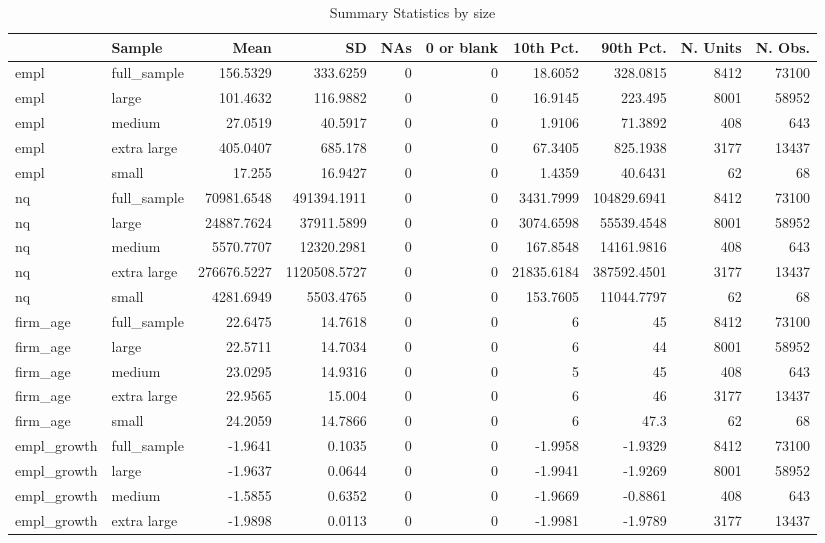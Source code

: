 \begin{table}[h]
  \caption{Summary Statistics by size }
  \centering
\begin{tabular}{l lr r r r r r r r}
\hline
 & Sample &Mean &SD &NAs &0 or blank &10th Pct. &90th Pct. &N. Units &N. Obs.\\
\hline
empl & full\_sample & 156.5329 & 333.6259 & 0 & 0 & 18.6052 & 328.0815 & 8412&73100\\
empl & large & 101.4632 & 116.9882 & 0 & 0 & 16.9145 & 223.495 & 8001&58952\\
empl & medium & 27.0519 & 40.5917 & 0 & 0 & 1.9106 & 71.3892 & 408&643\\
empl & extra large & 405.0407 & 685.178 & 0 & 0 & 67.3405 & 825.1938 & 3177&13437\\
empl & small & 17.255 & 16.9427 & 0 & 0 & 1.4359 & 40.6431 & 62&68\\
\hline
nq & full\_sample & 70981.6548 & 491394.1911 & 0 & 0 & 3431.7999 & 104829.6941 & 8412&73100\\
nq & large & 24887.7624 & 37911.5899 & 0 & 0 & 3074.6598 & 55539.4548 & 8001&58952\\
nq & medium & 5570.7707 & 12320.2981 & 0 & 0 & 167.8548 & 14161.9816 & 408&643\\
nq & extra large & 276676.5227 & 1120508.5727 & 0 & 0 & 21835.6184 & 387592.4501 & 3177&13437\\
nq & small & 4281.6949 & 5503.4765 & 0 & 0 & 153.7605 & 11044.7797 & 62&68\\
\hline
firm\_age & full\_sample & 22.6475 & 14.7618 & 0 & 0 & 6 & 45 & 8412&73100\\
firm\_age & large & 22.5711 & 14.7034 & 0 & 0 & 6 & 44 & 8001&58952\\
firm\_age & medium & 23.0295 & 14.9316 & 0 & 0 & 5 & 45 & 408&643\\
firm\_age & extra large & 22.9565 & 15.004 & 0 & 0 & 6 & 46 & 3177&13437\\
firm\_age & small & 24.2059 & 14.7866 & 0 & 0 & 6 & 47.3 & 62&68\\
\hline
empl\_growth & full\_sample & -1.9641 & 0.1035 & 0 & 0 & -1.9958 & -1.9329 & 8412&73100\\
empl\_growth & large & -1.9637 & 0.0644 & 0 & 0 & -1.9941 & -1.9269 & 8001&58952\\
empl\_growth & medium & -1.5855 & 0.6352 & 0 & 0 & -1.9669 & -0.8861 & 408&643\\
empl\_growth & extra large & -1.9898 & 0.0113 & 0 & 0 & -1.9981 & -1.9789 & 3177&13437\\

\end{tabular}
\end{table}
